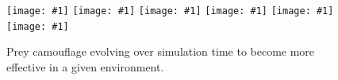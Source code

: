 \documentclass[letterpaper]{article}
\newcommand{\igsix}[1]{\texttt{[image: \#1]}}
\begin{document}






\begin{figure}
    \igsix{20221030_1220_step_19.png}
    \hfill
    \igsix{20221030_1220_step_1045.png}
    \hfill
    \igsix{20221030_1220_step_2014.png}
    \hfill
    \igsix{20221030_1220_step_3059.png}
    \hfill
    \igsix{20221030_1220_step_6650.png}
    \hfill
    \igsix{20221030_1220_step_7467.png}
    \caption{Prey camouflage evolving over simulation time to become more effective in a given environment.}
    \label{fig:time_sequence}
\end{figure}
\end{document}
